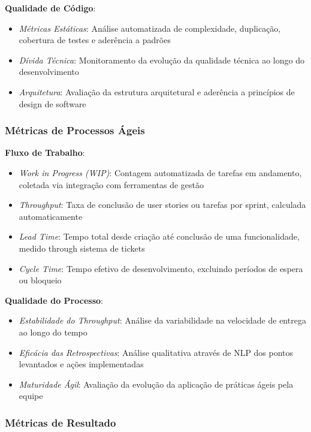 \documentclass[12pt,a4paper]{article}
\begin{document}
\textbf{Qualidade de Código}:
\begin{itemize}
  \item \textit{Métricas Estáticas}: Análise automatizada de complexidade, duplicação, cobertura de testes e aderência a padrões
  \item \textit{Dívida Técnica}: Monitoramento da evolução da qualidade técnica ao longo do desenvolvimento
  \item \textit{Arquitetura}: Avaliação da estrutura arquitetural e aderência a princípios de design de software
\end{itemize}

\subsubsection{Métricas de Processos Ágeis}

\textbf{Fluxo de Trabalho}:
\begin{itemize}
  \item \textit{Work in Progress (WIP)}: Contagem automatizada de tarefas em andamento, coletada via integração com ferramentas de gestão
  \item \textit{Throughput}: Taxa de conclusão de user stories ou tarefas por sprint, calculada automaticamente
  \item \textit{Lead Time}: Tempo total desde criação até conclusão de uma funcionalidade, medido through sistema de tickets
  \item \textit{Cycle Time}: Tempo efetivo de desenvolvimento, excluindo períodos de espera ou bloqueio
\end{itemize}

\textbf{Qualidade do Processo}:
\begin{itemize}
  \item \textit{Estabilidade do Throughput}: Análise da variabilidade na velocidade de entrega ao longo do tempo
  \item \textit{Eficácia das Retrospectivas}: Análise qualitativa através de NLP dos pontos levantados e ações implementadas
  \item \textit{Maturidade Ágil}: Avaliação da evolução da aplicação de práticas ágeis pela equipe
\end{itemize}

\subsubsection{Métricas de Resultado}
\end{document}
